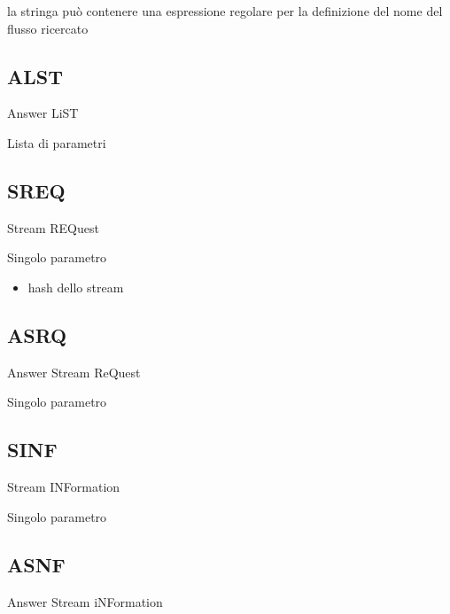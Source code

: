 la stringa può contenere una espressione regolare per la definizione del nome del flusso ricercato






\subsection{ALST}
%

Answer LiST



Lista di parametri






\subsection{SREQ}
%

Stream REQuest



Singolo parametro



\begin{itemize}
\item hash dello stream
\end{itemize}




\subsection{ASRQ}
%

Answer Stream ReQuest



Singolo parametro






\subsection{SINF}
%

Stream INFormation



Singolo parametro






\subsection{ASNF}
%

Answer Stream iNFormation



